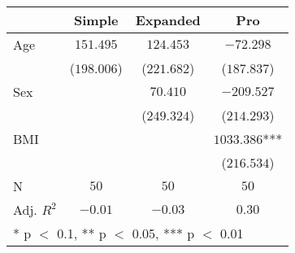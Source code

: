 
\begin{tabular}[t]{lccc}
\toprule
  & Simple & Expanded & Pro\\
\midrule
Age & $151.495$ & $124.453$ & $-72.298$\\
 & ($198.006$) & ($221.682$) & ($187.837$)\\
Sex &  & $70.410$ & $-209.527$\\
 &  & ($249.324$) & ($214.293$)\\
BMI &  &  & $1033.386$***\\
 &  &  & ($216.534$)\\
\midrule
N & $50$ & $50$ & $50$\\
Adj. $R^2$ & $-0.01$ & $-0.03$ & $0.30$\\
\bottomrule
\multicolumn{4}{l}{\rule{0pt}{1em}* p $<$ 0.1, ** p $<$ 0.05, *** p $<$ 0.01}\\
\end{tabular}

